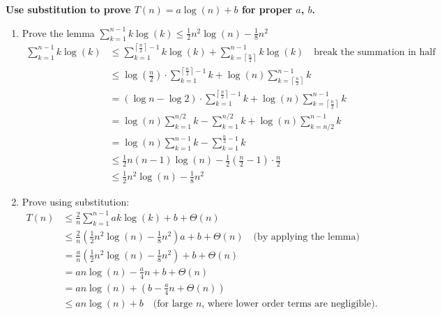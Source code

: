\begin{derivation}
        \textbf{Use substitution to prove \( T(n) = a \log(n) + b \) for proper \( a \), \( b \).}
        \begin{enumerate}
            \item Prove the lemma $\sum_{k=1}^{n-1} k \log(k) \leq \frac{1}{2} n^2 \log(n) - \frac{1}{8} n^2$
            \begin{align*}
                \sum_{k=1}^{n-1} k \log(k) &\leq \sum_{k=1}^{\left\lceil \frac{n}{2} \right\rceil-1} k \log(k) + \sum_{k=\left\lceil \frac{n}{2} \right\rceil}^{n-1} k \log(k) \quad \text{break the summation in half} \\
                &\leq \log \left(\frac{n}{2}\right) \cdot \sum_{k=1}^{\left\lceil \frac{n}{2} \right\rceil-1} k + \log(n) \sum_{k=\left\lceil \frac{n}{2} \right\rceil}^{n-1} k \\
                &= (\log n - \log 2) \cdot \sum_{k=1}^{\left\lceil \frac{n}{2} \right\rceil-1} k + \log(n) \sum_{k=\left\lceil \frac{n}{2} \right\rceil}^{n-1} k \\
                &= \log(n) \sum_{k=1}^{n/2} k - \sum_{k=1}^{n/2} k + \log(n) \sum_{k=n/2}^{n-1} k \\
                &= \log(n) \sum_{k=1}^{n-1} k - \sum_{k=1}^{\frac{n}{2}-1} k \\
                &\leq \frac{1}{2}n(n-1) \log(n) - \frac{1}{2} \left(\frac{n}{2} - 1\right) \cdot \frac{n}{2} \\
                &\leq \frac{1}{2} n^2 \log(n) - \frac{1}{8} n^2
            \end{align*}

            \item Prove using substitution:
            \begin{align*}
                T(n) &\leq \frac{2}{n} \sum_{k=1}^{n-1} a k \log(k) + b + \Theta(n) \\
                    &\leq \frac{2}{n} \left( \frac{1}{2} n^2 \log(n) - \frac{1}{8} n^2 \right) a + b + \Theta(n) \quad \text{(by applying the lemma)} \\
                    &= \frac{a}{n} \left( \frac{1}{2} n^2 \log(n) - \frac{1}{8} n^2 \right) + b + \Theta(n) \\
                    &= a n \log(n) - \frac{a}{4} n + b + \Theta(n) \\
                    &= a n \log(n) + \left( b - \frac{a}{4} n + \Theta(n) \right) \\
                    &\leq a n \log(n) + b \quad \text{(for large \(n\), where lower order terms are negligible)}.
            \end{align*}

        \end{enumerate}
    \end{derivation}


